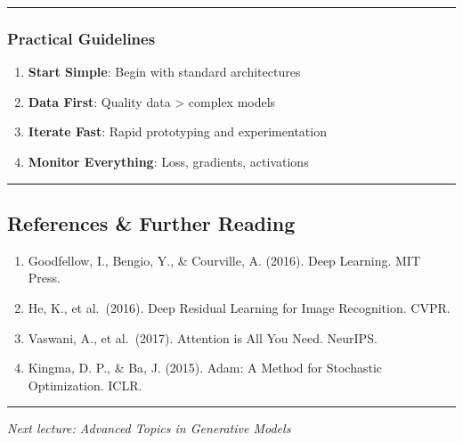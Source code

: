 \documentclass[
  letterpaper,
  DIV=11,
  numbers=noendperiod]{scrartcl}
\providecommand{\tightlist}{%
  \setlength{\itemsep}{0pt}\setlength{\parskip}{0pt}}
\begin{document}
\begin{center}\rule{0.5\linewidth}{0.5pt}\end{center}

\subsubsection{Practical Guidelines}\label{practical-guidelines}

\begin{enumerate}
\def\labelenumi{\arabic{enumi}.}
\tightlist
\item
  \textbf{Start Simple}: Begin with standard architectures
\item
  \textbf{Data First}: Quality data \textgreater{} complex models
\item
  \textbf{Iterate Fast}: Rapid prototyping and experimentation
\item
  \textbf{Monitor Everything}: Loss, gradients, activations
\end{enumerate}

\begin{center}\rule{0.5\linewidth}{0.5pt}\end{center}

\subsection{References \& Further
Reading}\label{references-further-reading}

\begin{enumerate}
\def\labelenumi{\arabic{enumi}.}
\tightlist
\item
  Goodfellow, I., Bengio, Y., \& Courville, A. (2016). Deep Learning.
  MIT Press.
\item
  He, K., et al.~(2016). Deep Residual Learning for Image Recognition.
  CVPR.
\item
  Vaswani, A., et al.~(2017). Attention is All You Need. NeurIPS.
\item
  Kingma, D. P., \& Ba, J. (2015). Adam: A Method for Stochastic
  Optimization. ICLR.
\end{enumerate}

\begin{center}\rule{0.5\linewidth}{0.5pt}\end{center}

\emph{Next lecture: Advanced Topics in Generative Models}
\end{document}
